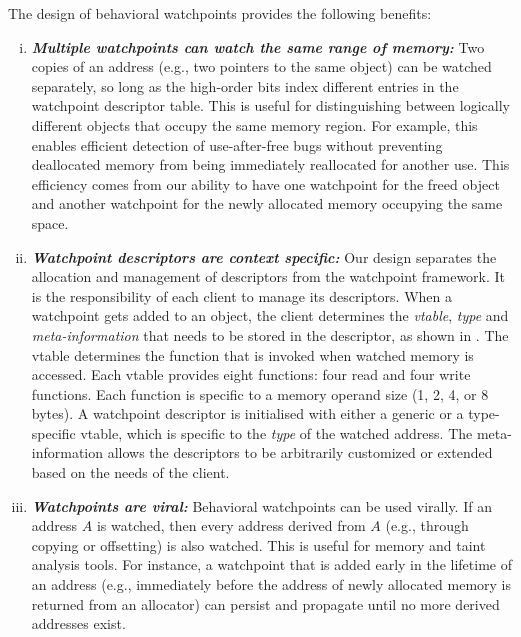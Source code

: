 


The design of behavioral watchpoints provides the following benefits:
\begin{enumerate}[i)]
\item \emph{\textbf{Multiple watchpoints can watch the same range of memory:}} 
Two copies of an address (e.g., two pointers to the same object) can be watched separately, so long as the high-order bits index different entries in the watchpoint descriptor table. %
This is useful for distinguishing between logically different objects that occupy the same memory region. For example, this enables efficient detection of use-after-free bugs without preventing deallocated memory from being immediately reallocated for another use. This efficiency comes from our ability to have one watchpoint for the freed object and another watchpoint for the newly allocated memory occupying the same space.

\item \emph{\textbf{Watchpoint descriptors are context specific:}} 
Our design separates the allocation and management of descriptors from the watchpoint framework. It is the responsibility of each client to manage its descriptors. When a watchpoint gets added to an object, the client determines the \emph{vtable}, \emph{type} and \emph{meta-information} that needs to be stored in the descriptor, as shown in . The vtable determines the function that is invoked when watched memory is accessed. Each vtable provides eight functions: four read and four write functions. Each function is specific to a memory operand size (1, 2, 4, or 8 bytes). A watchpoint descriptor is initialised with either a generic or a type-specific vtable, which is specific to the \emph{type} of the watched address. The meta-information allows the descriptors to be arbitrarily customized or extended based on the needs of the client.

\item \emph{\textbf{Watchpoints are viral:}}
Behavioral watchpoints can be used virally. If an address $A$ is watched, then every address derived from $A$ (e.g., through copying or offsetting) is also watched. This is useful for memory and taint analysis tools. For instance, a watchpoint that is added early in the lifetime of an address (e.g., immediately before the address of newly allocated memory is returned from an allocator) can persist and propagate until no more derived addresses exist.
\end{enumerate}

